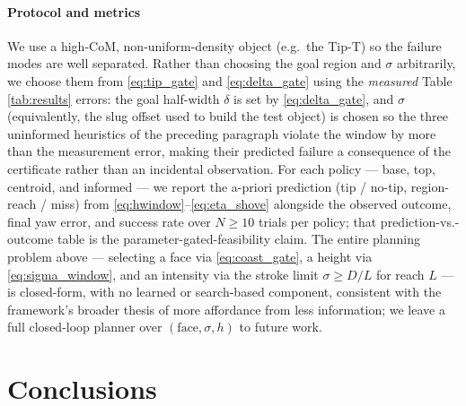 \documentclass[10pt, conference]{IEEEtran}
\begin{document}
\paragraph{Protocol and metrics}
We use a high-CoM, non-uniform-density object (e.g.\ the Tip-T) so the failure modes are well separated. Rather than choosing the goal region and $\sigma$ arbitrarily, we choose them from \eqref{eq:tip_gate} and \eqref{eq:delta_gate} using the \emph{measured} Table \ref{tab:results} errors: the goal half-width $\delta$ is set by \eqref{eq:delta_gate}, and $\sigma$ (equivalently, the slug offset used to build the test object) is chosen so the three uninformed heuristics of the preceding paragraph violate the window by more than the measurement error, making their predicted failure a consequence of the certificate rather than an incidental observation. For each policy --- base, top, centroid, and informed --- we report the a-priori prediction (tip / no-tip, region-reach / miss) from \eqref{eq:hwindow}--\eqref{eq:eta_shove} alongside the observed outcome, final yaw error, and success rate over $N\ge10$ trials per policy; that prediction-vs.-outcome table is the parameter-gated-feasibility claim. The entire planning problem above --- selecting a face via \eqref{eq:coast_gate}, a height via \eqref{eq:sigma_window}, and an intensity via the stroke limit $\sigma \ge D/L$ for reach $L$ --- is closed-form, with no learned or search-based component, consistent with the framework's broader thesis of more affordance from less information; we leave a full closed-loop planner over $(\text{face},\sigma,h)$ to future work.


\section{Conclusions} \label{sec:conclusion}
\end{document}
